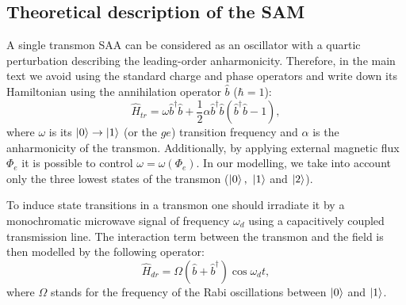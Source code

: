\documentclass[%
 aip,
 amsmath,amssymb,
 reprint,%
]{revtex4-1}
\begin{document}
\subsection{Theoretical description of the SAM}

A single transmon SAA can be considered as an oscillator with a quartic perturbation describing the leading-order anharmonicity. Therefore, in the main text we avoid using the standard charge and phase operators and write down its Hamiltonian using the annihilation operator $\hat b$ ($\hbar = 1$):
\begin{equation}
\hat{{H}}_{tr} = \omega \hat b^{\dagger}\hat b +\frac{1}{2}\alpha \hat b^{\dagger}\hat b(\hat b^{\dagger}\hat b-1),
\end{equation}
where $\omega$ is its $\ket{0}\rightarrow\ket{1}$ (or the  $ge$) transition frequency and $\alpha$ is the anharmonicity of the transmon. Additionally, by applying external magnetic flux $\Phi_e$ it is possible to control $\omega = \omega(\Phi_e)$\cite{koch2007charge}. In our modelling, we take into account only the three lowest states of the transmon ($\ket{0},\ \ket{1}$ and $\ket{2}$).

To induce state transitions in a transmon one should irradiate it by a monochromatic microwave signal of frequency $\omega_d$ using a capacitively coupled transmission line. The interaction term between the transmon and the field is then modelled by the following operator: 
\begin{equation}
\hat H_{dr} = \Omega (\hat b+\hat b^{\dagger}) \cos\omega_d t,
\end{equation}
where $\Omega$ stands for the frequency of the Rabi oscillations between $\ket{0}$ and $\ket{1}$.
\end{document}
